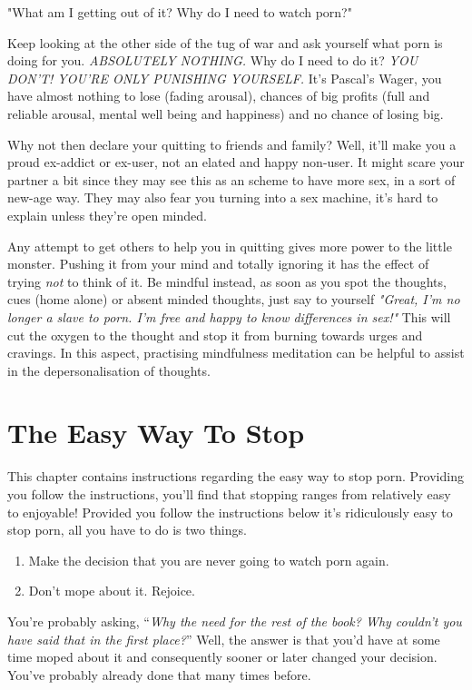 \documentclass[
]{book}
\begin{document}
"What am I getting out of it? Why do I need to watch porn?"

Keep looking at the other side of the tug of war and ask yourself what porn is doing for you. \emph{ABSOLUTELY NOTHING.} Why do I need to do it? \emph{YOU DON'T! YOU'RE ONLY PUNISHING YOURSELF.} It's Pascal's Wager, you have almost nothing to lose (fading arousal), chances of big profits (full and reliable arousal, mental well being and happiness) and no chance of losing big.

Why not then declare your quitting to friends and family? Well, it'll make you a proud ex-addict or ex-user, not an elated and happy non-user. It might scare your partner a bit since they may see this as an scheme to have more sex, in a sort of new-age way. They may also fear you turning into a sex machine, it's hard to explain unless they're open minded.

Any attempt to get others to help you in quitting gives more power to the little monster. Pushing it from your mind and totally ignoring it has the effect of trying \emph{not} to think of it. Be mindful instead, as soon as you spot the thoughts, cues (home alone) or absent minded thoughts, just say to yourself \emph{"Great, I'm no longer a slave to porn. I'm free and happy to know differences in sex!"} This will cut the oxygen to the thought and stop it from burning towards urges and cravings. In this aspect, practising mindfulness meditation can be helpful to assist in the depersonalisation of thoughts.

\hypertarget{the-easy-way-to-stop}{%
\chapter{The Easy Way To Stop}\label{the-easy-way-to-stop}}

This chapter contains instructions regarding the easy way to stop porn. Providing you follow the instructions, you'll find that stopping ranges from relatively easy to enjoyable! Provided you follow the instructions below it's ridiculously easy to stop porn, all you have to do is two things.

\begin{enumerate}
\def\labelenumi{\arabic{enumi}.}
\item
  Make the decision that you are never going to watch porn again.
\item
  Don't mope about it. Rejoice.
\end{enumerate}

You're probably asking, ``\emph{Why the need for the rest of the book? Why couldn't you have said that in the first place?}'' Well, the answer is that you'd have at some time moped about it and consequently sooner or later changed your decision. You've probably already done that many times before.
\end{document}
